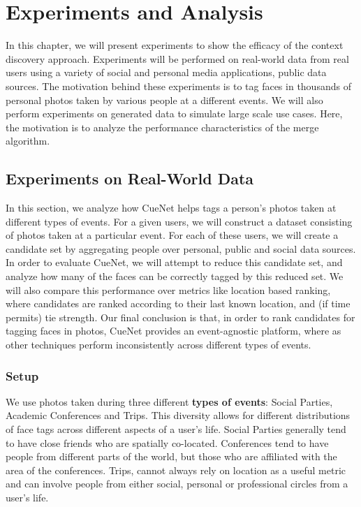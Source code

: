 \chapter{Experiments and Analysis}

In this chapter, we will present experiments to show the efficacy of the context discovery approach. Experiments will be performed on real-world data from real users using a variety of social and personal media applications, public data sources. The motivation behind these experiments is to tag faces in thousands of personal photos taken by various people at a different events. We will also perform experiments on generated data to simulate large scale use cases. Here, the motivation is to analyze the performance characteristics of the merge algorithm.

\section{Experiments on Real-World Data}
In this section, we analyze how CueNet helps tags a person's photos taken at different types of events. For a given users, we will construct a dataset consisting of photos taken at a particular event. For each of these users, we will create a candidate set by aggregating people over personal, public and social data sources. In order to evaluate CueNet, we will attempt to reduce this candidate set, and analyze how many of the faces can be correctly tagged by this reduced set. We will also compare this performance over metrics like location based ranking, where candidates are ranked according to their last known location, and (if time permits) tie strength. Our final conclusion is that, in order to rank candidates for tagging faces in photos, CueNet provides an event-agnostic platform, where as other techniques perform inconsistently across different types of events.

\subsection{Setup}
We use photos taken during three different \textbf{types of events}: Social Parties, Academic Conferences and Trips. This diversity allows for different distributions of face tags across different aspects of a user's life. Social Parties generally tend to have close friends who are spatially co-located. Conferences tend to have people from different parts of the world, but those who are affiliated with the area of the conferences. Trips, cannot always rely on location as a useful metric and can involve people from either social, personal or professional circles from a user's life. 

